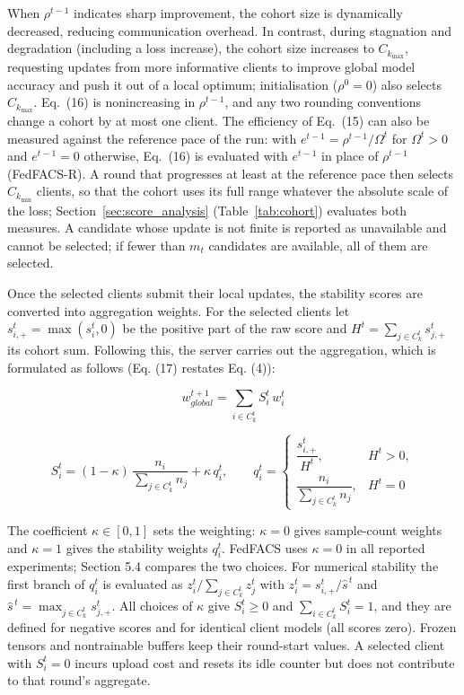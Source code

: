 \documentclass[pdflatex,sn-mathphys-num,oneside]{sn-jnl}%
\theoremstyle{thmstyleone}%
\theoremstyle{thmstyletwo}%
\theoremstyle{thmstylethree}%
\begin{document}
When $\rho^{t-1}$ indicates sharp improvement, the cohort size is dynamically decreased, reducing communication overhead. In contrast, during stagnation and degradation (including a loss increase), the cohort size increases to $C_{k_{\max}}$, requesting updates from more informative clients to improve global model accuracy and push it out of a local optimum; initialisation ($\rho^0=0$) also selects $C_{k_{\max}}$. Eq.~(16) is nonincreasing in $\rho^{t-1}$, and any two rounding conventions change a cohort by at most one client. The efficiency of Eq.~(15) can also be measured against the reference pace of the run: with $e^{t-1}=\rho^{t-1}/\Omega^{t}$ for $\Omega^{t}>0$ and $e^{t-1}=0$ otherwise, Eq.~(16) is evaluated with $e^{t-1}$ in place of $\rho^{t-1}$ (FedFACS-R). A round that progresses at least at the reference pace then selects $C_{k_{\min}}$ clients, so that the cohort uses its full range whatever the absolute scale of the loss; Section~\ref{sec:score_analysis} (Table~\ref{tab:cohort}) evaluates both measures. A candidate whose update is not finite is reported as unavailable and cannot be selected; if fewer than $m_t$ candidates are available, all of them are selected.

Once the selected clients submit their local updates, the stability scores are converted into aggregation weights. For the selected clients let $s_{i,+}^t=\max(s_i^t,0)$ be the positive part of the raw score and $H^t=\sum_{j\in C_k^t}s_{j,+}^t$ its cohort sum. Following this, the server carries out the aggregation, which is formulated as follows (Eq. (17) restates Eq. (4)):

\begin{equation}
w_{{global}}^{t+1} = \sum_{i \in C_k^t} S_i^t \, w_i^t
\label{eq:stability_weighted_update}
\end{equation}

\begin{equation}
S_i^t = (1-\kappa)\,\dfrac{n_i}{\sum_{j\in C_k^t} n_j} + \kappa\,q_i^t,\qquad q_i^t=\begin{cases}
\dfrac{s_{i,+}^t}{H^t}, & H^t>0,\\[1.5ex]
\dfrac{n_i}{\sum_{j\in C_k^t} n_j}, & H^t=0
\end{cases}
\label{eq:stability_norm}
\end{equation}

The coefficient $\kappa\in[0,1]$ sets the weighting: $\kappa=0$ gives sample-count weights and $\kappa=1$ gives the stability weights $q_i^t$. FedFACS uses $\kappa=0$ in all reported experiments; Section 5.4 compares the two choices. For numerical stability the first branch of $q_i^t$ is evaluated as $z_i^t/\sum_{j\in C_k^t}z_j^t$ with $z_i^t=s_{i,+}^t/\hat{s}^{\,t}$ and $\hat{s}^{\,t}=\max_{j\in C_k^t}s_{j,+}^t$. All choices of $\kappa$ give $S_i^t\ge 0$ and $\sum_{i\in C_k^t}S_i^t=1$, and they are defined for negative scores and for identical client models (all scores zero). Frozen tensors and nontrainable buffers keep their round-start values. A selected client with $S_i^t=0$ incurs upload cost and resets its idle counter but does not contribute to that round's aggregate.
\end{document}
